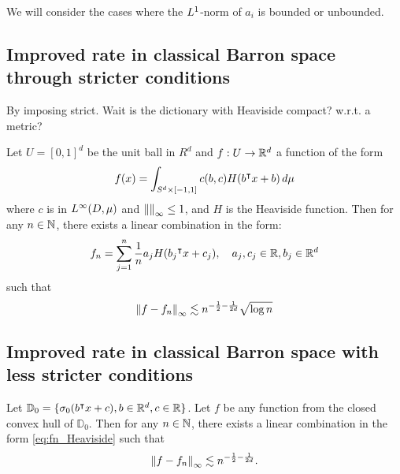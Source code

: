 We will consider the cases where the $L^{1}$-norm of $a_i$ is bounded or
unbounded.



\subsection{Improved rate in classical Barron space through stricter conditions}

By imposing strict. Wait is the dictionary with Heaviside compact? w.r.t. a
metric?

\begin{theorem}\cite[Theorem 2, p. 218]{makovozUniformApproximationNeural1998}

    Let $U = [0,1]^d$ be the unit ball in $R^d$ and $f: U \to \mathbb{R}^d$ a function
    of the form
    \begin{equation}
        f(x) = \int_{S^d \times [-1,1]} c(b,c) H(b{}^{\intercal} x + b)\,d\mu
    \end{equation}
    where $c$ is in $L^{\infty}(D, \mu)$ and $\left\|  \right\|_{\infty} \leq 1$, and $H$
    is the Heaviside function. Then for any $n \in \mathbb{N}$, there exists a linear
    combination in the form:
    \begin{equation}
        \label{eq:fn_Heaviside}
        f_n = \sum_{j=1}^n \frac{1}{n} a_j H(b_j{}^{\intercal} x + c_j), \quad
        a_j,c_j \in\mathbb{R}, b_j \in \mathbb{R}^d
    \end{equation}
    such that
    \begin{equation}
        \left\| f - f_n \right\|_{\infty} \lesssim 
        n^{-\frac{1}{2} - \frac{1}{2d}} \sqrt{\log{n}}
    \end{equation}
\end{theorem}

\begin{corollary}
\end{corollary}

\subsection{Improved rate in classical Barron space with less stricter conditions}

\begin{theorem}\cite[Theorem 4, p. 45]{maUniformApproximationRates2022} 
    
    Let $\mathbb{D}_0 = \{\sigma_0(b{}^{\intercal} x+c), b\in\mathbb{R}^d, c\in\mathbb{R}\}$. Let $f$ be
    any function from the closed convex hull of $\mathbb{D}_0$.  Then for any $n
    \in \mathbb{N}$, there exists a linear combination in the form
    \eqref{eq:fn_Heaviside} such that
    \begin{equation}
        \left\| f - f_n \right\|_{\infty} \lesssim 
        n^{-\frac{1}{2} - \frac{1}{2d}}.
    \end{equation}

\end{theorem}

